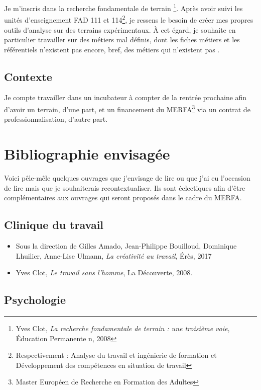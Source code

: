 \documentclass{article}
\begin{document}
Je m'inscris dans la recherche fondamentale de terrain \footnote{Yves Clot, \emph{La recherche fondamentale de terrain : une troisième voie}, Éducation Permanente n, 2008}. Après avoir suivi les unités d'enseignement FAD 111 et 114\footnote{Respectivement : \og Analyse du travail et ingénierie de formation \fg{} et \og Développement des compétences en situation de travail \fg{}}, je ressens le besoin de créer mes propres outils d'analyse sur des terrains expérimentaux. À cet égard, je souhaite en particulier travailler sur des métiers mal définis, dont les fiches métiers et les référentiels n'existent pas encore, bref, des métiers qui \og n'existent pas \fg{}.

\subsection{Contexte}

Je compte travailler dans un incubateur à compter de la rentrée prochaine afin d'avoir un terrain, d'une part, et un financement du MERFA\footnote{Master Européen de Recherche en Formation des Adultes} via un contrat de professionnalisation, d'autre part.\label{terrain} 

\section{Bibliographie envisagée}

Voici pêle-mêle quelques ouvrages que j'envisage de lire ou que j'ai eu l'occasion de lire mais que je souhaiterais recontextualiser. Ils sont éclectiques afin d'être complémentaires aux ouvrages qui seront proposés dans le cadre du MERFA.

\subsection{Clinique du travail}

\begin{itemize}

\item Sous la direction de Gilles Amado, Jean-Philippe Bouilloud, Dominique Lhuilier, Anne-Lise Ulmann, \textit{La créativité au travail}, Érès, 2017
\item Yves Clot, \textit{Le travail sans l’homme}, La Découverte, 2008.

\end{itemize}

\subsection{Psychologie}
\end{document}
